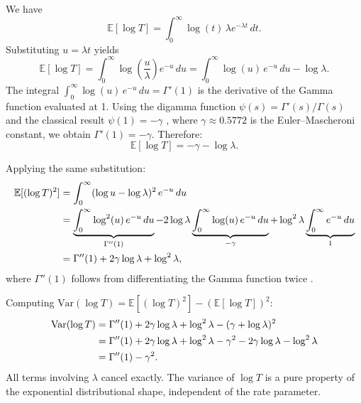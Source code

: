 \documentclass[12pt]{article}
\theoremstyle{definition}
\theoremstyle{remark}
\begin{document}
\begin{appendices}
We have
\begin{equation}
    \mathbb{E}[\log T] = \int_0^\infty \log(t)\, \lambda e^{-\lambda t}\, dt.
\end{equation}
Substituting $u = \lambda t$ yields
\begin{equation}
    \mathbb{E}[\log T] = \int_0^\infty \log\!\left(\frac{u}{\lambda}\right) e^{-u}\, du = \int_0^\infty \log(u)\, e^{-u}\, du - \log\lambda.
\end{equation}
The integral $\int_0^\infty \log(u)\, e^{-u}\, du = \Gamma'(1)$ is the derivative of the Gamma function evaluated at 1. Using the digamma function $\psi(s) = \Gamma'(s)/\Gamma(s)$ and the classical result $\psi(1) = -\gamma$ \citep{abramowitz1965}, where $\gamma \approx 0.5772$ is the Euler--Mascheroni constant, we obtain $\Gamma'(1) = -\gamma$. Therefore:
\begin{equation}\label{eq:mean_logT}
    \mathbb{E}[\log T] = -\gamma - \log\lambda.
\end{equation}


Applying the same substitution:
\begin{align}
    \mathbb{E}[(\log T)^2] &= \int_0^\infty (\log u - \log\lambda)^2\, e^{-u}\, du \notag \\
    &= \underbrace{\int_0^\infty \log^2(u)\, e^{-u}\, du}_{\Gamma''(1)} - 2\log\lambda \underbrace{\int_0^\infty \log(u)\, e^{-u}\, du}_{-\gamma} + \log^2\lambda \underbrace{\int_0^\infty e^{-u}\, du}_{1} \notag \\
    &= \Gamma''(1) + 2\gamma\log\lambda + \log^2\lambda, \label{eq:second_moment}
\end{align}
where $\Gamma''(1)$ follows from differentiating the Gamma function twice \citep{abramowitz1965}.



Computing $\text{Var}(\log T) = \mathbb{E}[(\log T)^2] - (\mathbb{E}[\log T])^2$:
\begin{align}
    \text{Var}(\log T) &= \Gamma''(1) + 2\gamma\log\lambda + \log^2\lambda - (\gamma + \log\lambda)^2 \notag \\
    &= \Gamma''(1) + 2\gamma\log\lambda + \log^2\lambda - \gamma^2 - 2\gamma\log\lambda - \log^2\lambda \notag \\
    &= \Gamma''(1) - \gamma^2. \label{eq:var_intermediate}
\end{align}
All terms involving $\lambda$ cancel exactly. The variance of $\log T$ is a pure property of the exponential distributional shape, independent of the rate parameter.




\end{appendices}
\end{document}
